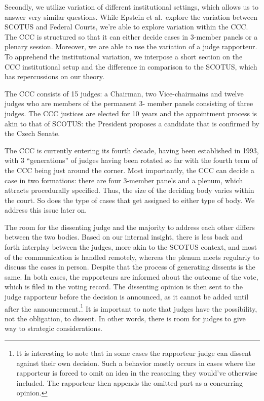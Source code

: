 \documentclass[
  11pt,
]{article}
\begin{document}
Secondly, we utilize variation of different institutional settings,
which allows us to answer very similar questions. While Epstein et
al.~explore the variation between SCOTUS and Federal Courts, we're able
to explore variation within the CCC. The CCC is structured so that it
can either decide cases in 3-member panels or a plenary session.
Moreover, we are able to use the variation of a judge rapporteur. To
apprehend the institutional variation, we interpose a short section on
the CCC institutional setup and the difference in comparison to the
SCOTUS, which has repercussions on our theory.

The CCC consists of 15 judges: a Chairman, two Vice-chairmains and
twelve judges who are members of the permanent 3- member panels
consisting of three judges. The CCC justices are elected for 10 years
and the appointment process is akin to that of SCOTUS: the President
proposes a candidate that is confirmed by the Czech Senate.

The CCC is currently entering its fourth decade, having been established
in 1993, with 3 ``generations'' of judges having been rotated so far
with the fourth term of the CCC being just around the corner. Most
importantly, the CCC can decide a case in two formations: there are four
3-member panels and a plenum, which attracts procedurally specified.
Thus, the size of the deciding body varies within the court. So does the
type of cases that get assigned to either type of body. We address this
issue later on.

The room for the dissenting judge and the majority to address each other
differs between the two bodies. Based on our internal insight, there is
less back and forth interplay between the judges, more akin to the
SCOTUS context, and most of the communication is handled remotely,
whereas the plenum meets regularly to discuss the cases in person.
Despite that the process of generating dissents is the same. In both
cases, the rapporteurs are informed about the outcome of the vote, which
is filed in the voting record. The dissenting opinion is then sent to
the judge rapporteur before the decision is announced, as it cannot be
added until after the announcement.\footnote{It is interesting to note
  that in some cases the rapporteur judge can dissent against their own
  decision. Such a behavior mostly occurs in cases where the rapporteur
  is forced to omit an idea in the reasoning they would've otherwise
  included. The rapporteur then appends the omitted part as a concurring
  opinion.} It is important to note that judges have the possibility,
not the obligation, to dissent. In other words, there is room for judges
to give way to strategic considerations.
\end{document}

